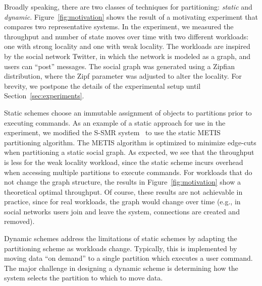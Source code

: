 Broadly speaking, there are two classes of techniques for
partitioning: \emph{static} and \emph{dynamic}.
Figure~\ref{fig:motivation} shows the result of a motivating
experiment that compares two representative systems. In the
experiment, we measured the throughput and number of state moves over
time with two different workloads: one with strong locality and one
with weak locality. The workloads are inspired by the social network
Twitter, in which the network is modeled as a graph, and users can
``post'' messages. The social graph was generated using a Zipfian
distribution, where the Zipf parameter was adjusted to alter the
locality.  For brevity, we postpone the details of the experimental
setup until Section~\ref{sec:experiments}.


Static schemes choose an immutable assignment of objects to partitions
prior to executing commands. As an example of a static approach for
use in the experiment, we modified the S-SMR
system~\cite{bezerra2014ssmr} to use the static
METIS~\cite{Abou-Rjeili:2006} partitioning algorithm.  The METIS
algorithm is optimized to minimize edge-cuts when partitioning a
static social graph. As expected, we see that the throughput is less
for the weak locality workload, since the static scheme incurs
overhead when accessing multiple partitions to execute commands.
For workloads that do not change the graph structure, the
results in Figure~\ref{fig:motivation} show a theoretical optimal
throughput.  Of course, these results are not achievable in practice,
since for real workloads, the graph would change over time (e.g., in
social networks users join and leave the system, connections are
created and removed).


Dynamic schemes address the limitations of static schemes by adapting
the partitioning scheme as workloads change.  Typically, this is
implemented by moving data ``on demand'' to a single partition which
executes a user command.  The major challenge in designing a dynamic
scheme is determining how the system selects the partition to which to
move data.


